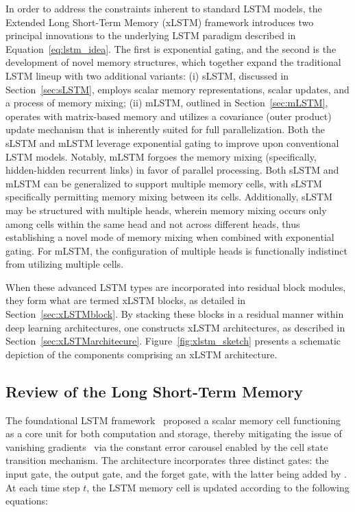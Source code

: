 In order to address the constraints inherent to standard LSTM models, the Extended Long Short-Term Memory (xLSTM) framework introduces two principal innovations to the underlying LSTM paradigm described in Equation~\eqref{eq:lstm_idea}. The first is exponential gating, and the second is the development of novel memory structures, which together expand the traditional LSTM lineup with two additional variants: (i) sLSTM, discussed in Section~\ref{sec:sLSTM}, employs scalar memory representations, scalar updates, and a process of memory mixing; (ii) mLSTM, outlined in Section~\ref{sec:mLSTM}, operates with matrix-based memory and utilizes a covariance (outer product) update mechanism that is inherently suited for full parallelization. Both the sLSTM and mLSTM leverage exponential gating to improve upon conventional LSTM models. Notably, mLSTM forgoes the memory mixing (specifically, hidden-hidden recurrent links) in favor of parallel processing. Both sLSTM and mLSTM can be generalized to support multiple memory cells, with sLSTM specifically permitting memory mixing between its cells. Additionally, sLSTM may be structured with multiple heads, wherein memory mixing occurs only among cells within the same head and not across different heads, thus establishing a novel mode of memory mixing when combined with exponential gating. For mLSTM, the configuration of multiple heads is functionally indistinct from utilizing multiple cells.

When these advanced LSTM types are incorporated into residual block modules, they form what are termed xLSTM blocks, as detailed in Section~\ref{sec:xLSTMblock}. By stacking these blocks in a residual manner within deep learning architectures, one constructs xLSTM architectures, as described in Section~\ref{sec:xLSTMarchitecure}. Figure~\ref{fig:xlstm_sketch} presents a schematic depiction of the components comprising an xLSTM architecture.

\subsection{Review of the Long Short-Term Memory}
\label{sec:orgLSTM}

The foundational LSTM framework~\citep{Hochreiter:91,Hochreiter:97nips,Hochreiter:97} proposed a scalar memory cell functioning as a core unit for both computation and storage, thereby mitigating the issue of vanishing gradients~\citep{Hochreiter:91,Hochreiter:00book} via the constant error carousel enabled by the cell state transition mechanism. The architecture incorporates three distinct gates: the input gate, the output gate, and the forget gate, with the latter being added by \citet{Gers:00}. At each time step $t$, the LSTM memory cell is updated according to the following equations:

